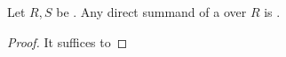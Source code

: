 \begin{proposition} \label{proposition:free_bimodule_over_rings_are_projective}
    Let $R, S$ be . 
    Any direct summand of a  over $R$ is .
\end{proposition}
\begin{proof}
    It suffices to 
\end{proof}